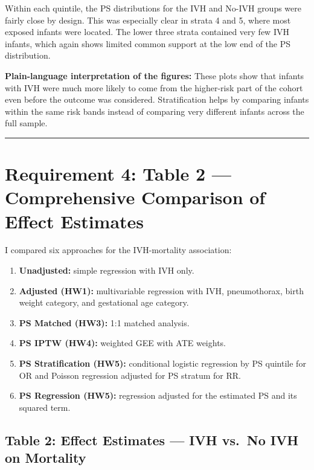 \documentclass[
]{article}
\providecommand{\tightlist}{%
  \setlength{\itemsep}{0pt}\setlength{\parskip}{0pt}}
\begin{document}
Within each quintile, the PS distributions for the IVH and No-IVH groups
were fairly close by design. This was especially clear in strata 4 and
5, where most exposed infants were located. The lower three strata
contained very few IVH infants, which again shows limited common support
at the low end of the PS distribution.

\textbf{Plain-language interpretation of the figures:} These plots show
that infants with IVH were much more likely to come from the higher-risk
part of the cohort even before the outcome was considered.
Stratification helps by comparing infants within the same risk bands
instead of comparing very different infants across the full sample.

\begin{center}\rule{0.5\linewidth}{0.5pt}\end{center}

\hypertarget{requirement-4-table-2-comprehensive-comparison-of-effect-estimates}{%
\section{Requirement 4: Table 2 --- Comprehensive Comparison of Effect
Estimates}\label{requirement-4-table-2-comprehensive-comparison-of-effect-estimates}}

I compared six approaches for the IVH-mortality association:

\begin{enumerate}
\def\labelenumi{\arabic{enumi}.}
\tightlist
\item
  \textbf{Unadjusted:} simple regression with IVH only.
\item
  \textbf{Adjusted (HW1):} multivariable regression with IVH,
  pneumothorax, birth weight category, and gestational age category.
\item
  \textbf{PS Matched (HW3):} 1:1 matched analysis.
\item
  \textbf{PS IPTW (HW4):} weighted GEE with ATE weights.
\item
  \textbf{PS Stratification (HW5):} conditional logistic regression by
  PS quintile for OR and Poisson regression adjusted for PS stratum for
  RR.
\item
  \textbf{PS Regression (HW5):} regression adjusted for the estimated PS
  and its squared term.
\end{enumerate}

\hypertarget{table-2-effect-estimates-ivh-vs.-no-ivh-on-mortality}{%
\subsection{Table 2: Effect Estimates --- IVH vs.~No IVH on
Mortality}\label{table-2-effect-estimates-ivh-vs.-no-ivh-on-mortality}}
\end{document}
